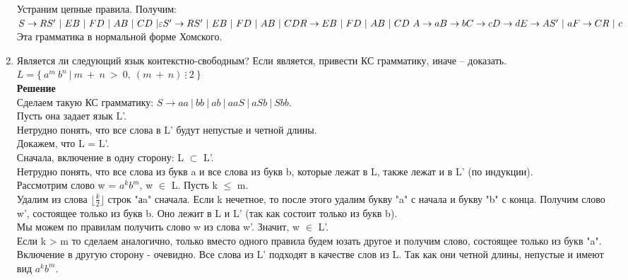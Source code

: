 \documentclass[12pt]{article}
\begin{document}
\begin{enumerate}
   Устраним цепные правила. Получим:\\
   $S \to RS'\ |\ EB\ |\ FD\ |\ AB\ |\ CD\ | \varepsilon\\
   S' \to RS'\ |\ EB\ |\ FD\ |\ AB\ |\ CD\\
   R \to EB\ |\ FD\ |\ AB\ |\ CD\\\
   A \to a\\
   B \to b\\
   C \to c\\
   D \to d\\
   E \to AS'\ |\ a \\
   F \to CR\ |\ c$\\
   Эта грамматика в нормальной форме Хомского.
  \item [\bf \textnumero 3] Является ли следующий язык контекстно-свободным? Если является, привести КС грамматику, иначе -- доказать. \\
  $L = \{\ a^m\ b^n\ |\ m\ +\ n\ >\ 0,\ (m\ +\ n)\ \vdots\ 2\ \}$ \\
  {\bf Решение}\\
  Сделаем такую КС грамматику: $S \to aa\ |\ bb\ |\ ab\ |\ aaS\ |\ aSb\ |\ Sbb$.\\ Пусть она задает язык L'.\\
  Нетрудно понять, что все слова в L' будут непустые и четной длины.\\
  Докажем, что L = L'.\\
  Сначала, включение в одну сторону: L $\subset$ L'. \\
  Нетрудно понять, что все слова из букв a и все слова из букв b, которые лежат в L, также лежат и в L' (по индукции).\\
  Рассмотрим слово w = $a^kb^m$, w $\in$ L. Пусть k $\le$ m.\\
  Удалим из слова $\lfloor\frac{k}{2}\rfloor$ строк "аa" сначала. Если k нечетное, то после этого удалим букву "a"  с начала и букву "b" с конца. Получим слово w', состоящее только из букв b. Оно лежит в L и L' (так как состоит только из букв b).\\
  Мы можем по правилам получить слово w из слова w'. Значит, w $\in$ L'.\\
  Если k > m то сделаем аналогично, только вместо одного правила будем юзать другое и получим слово, состоящее только из букв "a". 
  Включение в другую сторону - очевидно. Все слова из L' подходят в качестве слов из L. Так как они четной длины, непустые и имеют вид $a^kb^m$.
\end{enumerate}
\end{document}
